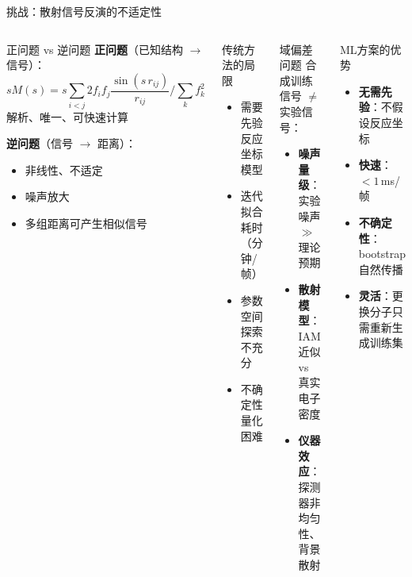 \documentclass[aspectratio=169,9pt]{beamer}
\begin{document}
\begin{frame}{挑战：散射信号反演的不适定性}
  \begin{columns}[T]
    \begin{block}{正问题 vs 逆问题}
      \scriptsize
      \textbf{正问题}（已知结构 $\to$ 信号）：
      \begin{equation*}
        sM(s) = s \sum_{i<j} 2f_i f_j \frac{\sin(s\,r_{ij})}{r_{ij}} \bigg/ \sum_k f_k^2
      \end{equation*}
      解析、唯一、可快速计算

      \vspace{4pt}
      \textbf{逆问题}（信号 $\to$ 距离）：
      \begin{itemize}
        \item 非线性、不适定
        \item 噪声放大
        \item 多组距离可产生相似信号
      \end{itemize}
    \end{block}

    \begin{alertblock}{传统方法的局限}
      \scriptsize
      \begin{itemize}
        \item 需要先验反应坐标模型
        \item 迭代拟合耗时（分钟/帧）
        \item 参数空间探索不充分
        \item 不确定性量化困难
      \end{itemize}
    \end{alertblock}

    \begin{block}{域偏差问题}
      \scriptsize
      合成训练信号 $\neq$ 实验信号：
      \begin{itemize}
        \item \textbf{噪声量级}：实验噪声 $\gg$ 理论预期
        \item \textbf{散射模型}：IAM近似 vs 真实电子密度
        \item \textbf{仪器效应}：探测器非均匀性、背景散射
      \end{itemize}
    \end{block}

    \begin{exampleblock}{ML方案的优势}
      \scriptsize
      \begin{itemize}
        \item \textbf{无需先验}：不假设反应坐标
        \item \textbf{快速}：$<1$\,ms/帧
        \item \textbf{不确定性}：bootstrap自然传播
        \item \textbf{灵活}：更换分子只需重新生成训练集
      \end{itemize}
    \end{exampleblock}


\end{columns}
\end{frame}
\end{document}
